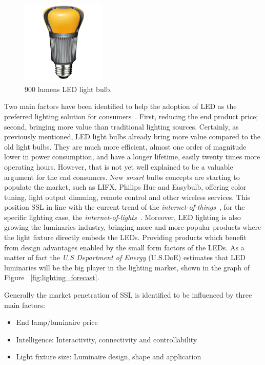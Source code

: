 \vspace{5mm} %


\begin{figure}
\centering
\includegraphics[width=4cm]{./0_intro/img/enduraled-12w.jpg}
\caption{900 lumens LED light bulb.}
\label{fig:l_prize}
\end{figure}

Two main factors have been identified to help the adoption of LED as the preferred lighting solution for consumers~\cite{11Voger}. First, reducing the end product price; second, bringing more value than traditional lighting sources. Certainly, as previously mentioned, LED light bulbs already bring more value compared to the old light bulbs. They are much more efficient, almost one order of magnitude lower in power consumption, and have a longer lifetime, easily twenty times more operating hours. However, that is not yet well explained to be a valuable argument for the end consumers. New \emph{smart} bulbs concepts are starting to populate the market, such as LIFX, Philips Hue and Easybulb, offering color tuning, light output dimming, remote control and other wireless services. This position SSL in line with the current trend of the \emph{internet-of-things}~\cite{03Qiu,atzori2010internet,weber2010internet}, for the specific lighting case, the \emph{internet-of-lights}~\cite{14Harbers,web:14Harbers}. Moreover, LED lighting is also growing the luminaries industry, bringing more and more popular products where the light fixture directly embeds the LEDs. Providing products which benefit from design advantages enabled by the small form factors of the LEDs. As a matter of fact the \emph{U.S Department of Energy} (U.S.DoE) estimates that LED luminaries will be the big player in the lighting market, shown in the graph of Figure ~\ref{fig:lighting_forecast}.

Generally the market penetration of SSL is identified to be influenced by three main factors:
\begin{itemize}
  \item End lamp/luminaire price
  \item Intelligence: Interactivity, connectivity and controllability\
  \item Light fixture size: Luminaire design, shape and application
\end{itemize}


